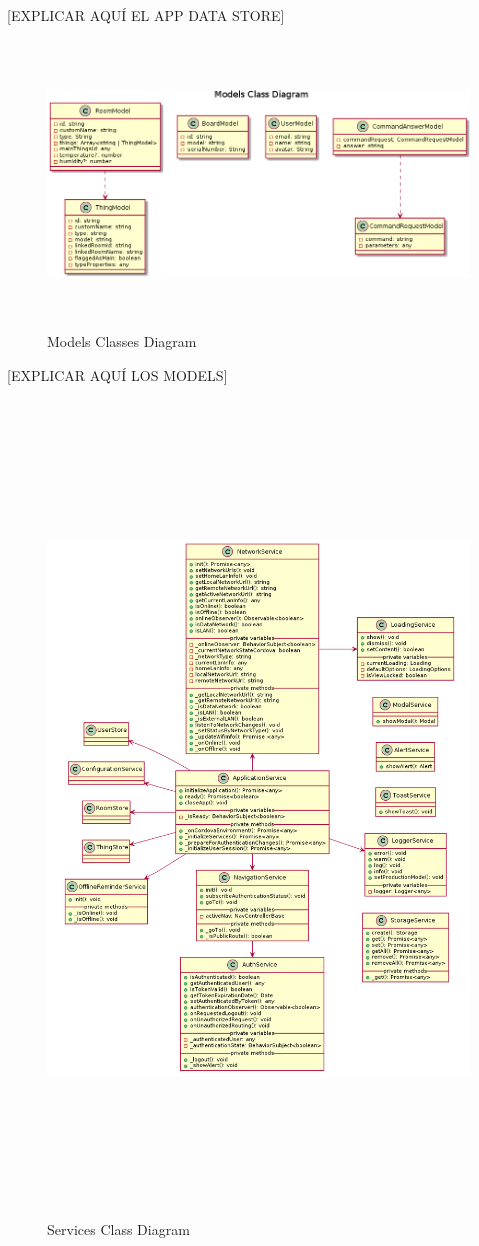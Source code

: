 [EXPLICAR AQUÍ EL APP DATA STORE]

\begin{figure}[hbt!]
\centering
\includegraphics[height=3in]{figures/diagrams/front/architecture/models.png}
\caption[models]{Models Classes Diagram\footnotemark}
\end{figure}

[EXPLICAR AQUÍ LOS MODELS]

\begin{figure}[hbt!]
\centering
\includegraphics[height=8.5in]{figures/diagrams/front/architecture/services.png}
\caption[services]{Services Class Diagram\footnotemark}
\end{figure}

